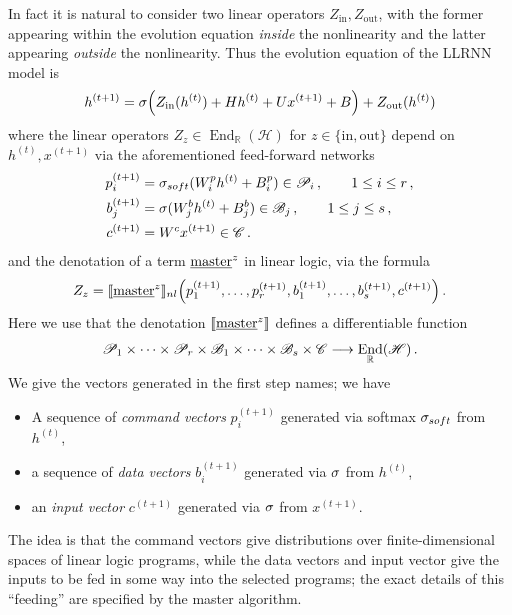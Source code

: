 \documentclass[english,letter paper,12pt,leqno]{article}
\theoremstyle{example}
\numberwithin{equation}{section}
\def\be{\begin{equation}}
\def\ee{\end{equation}}
\DeclareMathOperator{\End}{End}
\begin{document}
In fact it is natural to consider two linear operators $Z_{\operatorname{in}}, Z_{\operatorname{out}}$, with the former appearing within the evolution equation \emph{inside} the nonlinearity and the latter appearing \emph{outside} the nonlinearity. Thus the evolution equation of the LLRNN model is
\be\label{eq:masterh}
h^{(t+1)} = \relu\Big( Z_{\mathrm{in}}(h^{(t)}) + H h^{(t)} + U x^{(t+1)} + B\Big) + Z_{\mathrm{out}}(h^{(t)})
\ee
where the linear operators $Z_z \in \End_{\mathbb{R}}(\mathscr{H})$ for $z \in \{\mathrm{in},\mathrm{out}\}$ depend on $h^{(t)}, x^{(t+1)}$ via the aforementioned feed-forward networks
\begin{align*}
p_i^{(t+1)} &= \sigma_{soft}( W^p_i h^{(t)} + B^p_i ) \in \mathscr{P}_i\,, \qquad 1 \le i \le r\,,\\
b_j^{(t+1)} &= \sigma( W^b_j h^{(t)} + B^b_j ) \in \mathscr{B}_j\,, \qquad 1 \le j \le s\,,\\
c^{(t+1)} &=  W^c x^{(t+1)} \in \mathscr{C}\,.
\end{align*}
and the denotation of a term $\underline{\textup{master}}^z$ in linear logic, via the formula
\be\label{eq:masterz}
Z_z = \den{\underline{\mathrm{master}}^z}_{nl}\Big( p_1^{(t+1)}, \ldots, p_r^{(t+1)}, b_1^{(t+1)}, \ldots, b_s^{(t+1)}, c^{(t+1)}\Big)\,.
\ee
Here we use that the denotation $\llbracket \underline{\textup{master}}^z \rrbracket$ defines a differentiable function
\be
\mathscr{P}_1 \times \cdots \times \mathscr{P}_r \times \mathscr{B}_1 \times \cdots \times \mathscr{B}_s \times \mathscr{C} \lto \End_{\mathbb{R}}(\mathscr{H})\,.
\ee
We give the vectors generated in the first step names; we have


\begin{itemize}
\item A sequence of \emph{command vectors} $p_i^{(t+1)}$ generated via softmax $\sigma_{soft}$ from $h^{(t)}$,
\item a sequence of \emph{data vectors} $b_i^{(t+1)}$ generated via $\sigma$ from $h^{(t)}$,
\item an \emph{input vector} $c^{(t+1)}$ generated via $\sigma$ from $x^{(t+1)}$.
\end{itemize}
The idea is that the command vectors give distributions over finite-dimensional spaces of linear logic programs, while the data vectors and input vector give the inputs to be fed in some way into the selected programs; the exact details of this ``feeding'' are specified by the master algorithm. 
\end{document}
